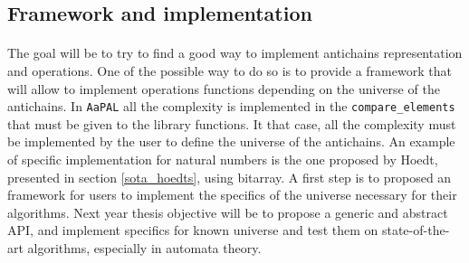 \documentclass[letterpaper]{article}
\theoremstyle{definition}
\begin{document}
\subsection{Framework and implementation}

\paragraph{}


The goal will be to try to find a good
way to implement antichains representation
and operations. One of the possible way to do so is to provide
a framework that will allow to implement
operations functions
depending on the universe of the antichains.
In \texttt{AaPAL} all the complexity
is implemented in the \texttt{compare\_elements} that must be given
to the library functions. It that case, all the complexity
must be implemented by the user to define the universe of the antichains.
An example of specific implementation for natural numbers is the one
proposed by Hoedt, presented in section \ref{sota_hoedts},
using bitarray. A first step
is to proposed an framework for users to implement the specifics of the
universe necessary for their algorithms. Next year thesis objective will
be to propose a generic and abstract API, and implement specifics
for known universe and test them on state-of-the-art algorithms,
especially in automata theory.






\end{document}
